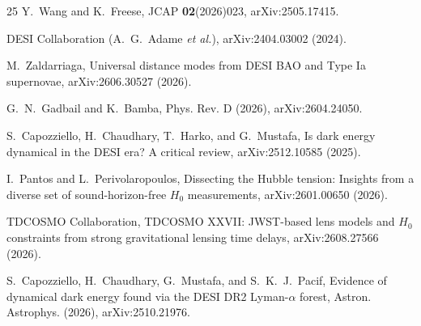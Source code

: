 \documentclass[aps,prd,twocolumn,superscriptaddress,nofootinbib]{revtex4-2}
\begin{document}
\begin{thebibliography}{25}
Y.~Wang and K.~Freese, JCAP \textbf{02}(2026)023, arXiv:2505.17415.

DESI Collaboration (A.~G.~Adame \emph{et al.}), arXiv:2404.03002 (2024).

M.~Zaldarriaga, Universal distance modes from DESI BAO and Type Ia supernovae, arXiv:2606.30527 (2026).

G.~N.~Gadbail and K.~Bamba, Phys. Rev. D (2026), arXiv:2604.24050.

S.~Capozziello, H.~Chaudhary, T.~Harko, and G.~Mustafa, Is dark energy dynamical in the DESI era? A critical review, arXiv:2512.10585 (2025).

I.~Pantos and L.~Perivolaropoulos, Dissecting the Hubble tension: Insights from a diverse set of sound-horizon-free $H_0$ measurements, arXiv:2601.00650 (2026).

TDCOSMO Collaboration, TDCOSMO XXVII: JWST-based lens models and $H_0$ constraints from strong gravitational lensing time delays, arXiv:2608.27566 (2026).

S.~Capozziello, H.~Chaudhary, G.~Mustafa, and S.~K.~J.~Pacif, Evidence of dynamical dark energy found via the DESI DR2 Lyman-$\alpha$ forest, Astron. Astrophys. (2026), arXiv:2510.21976.

\end{thebibliography}
\end{document}
